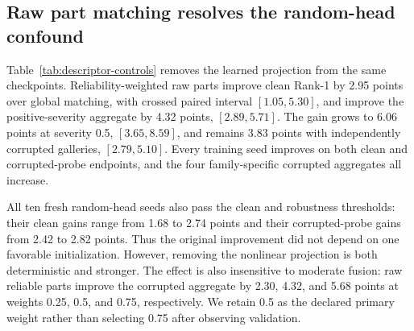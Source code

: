 \documentclass[pdflatex,iicol,sn-apa]{sn-jnl}
\begin{document}
\subsection{Raw part matching resolves the random-head confound}

\begin{table}[t]
\centering
\caption{Checkpoint-only descriptor controls on CASIA-B validation Rank-1
(\%). All conditions use the same three selected metric-baseline backbones and
the fixed 0.5 fusion weight. ``Fresh random heads'' is the mean across ten
projection seeds; brackets give the range after averaging the three backbone
seeds. No control retrains the backbone or local head.}
\label{tab:descriptor-controls}
\small
\setlength{\tabcolsep}{3.5pt}
\end{table}

Table~\ref{tab:descriptor-controls} removes the learned projection from the
same checkpoints. Reliability-weighted raw parts improve clean Rank-1 by 2.95
points over global matching, with crossed paired interval
$[1.05,5.30]$, and improve the positive-severity aggregate by 4.32 points,
$[2.89,5.71]$. The gain grows to 6.06 points at severity 0.5,
$[3.65,8.59]$, and remains 3.83 points with independently corrupted galleries,
$[2.79,5.10]$. Every training seed improves on both clean and corrupted-probe
endpoints, and the four family-specific corrupted aggregates all increase.

All ten fresh random-head seeds also pass the clean and robustness thresholds:
their clean gains range from 1.68 to 2.74 points and their corrupted-probe gains
from 2.42 to 2.82 points. Thus the original improvement did not depend on one
favorable initialization. However, removing the nonlinear projection is both
deterministic and stronger. The effect is also insensitive to moderate fusion:
raw reliable parts improve the corrupted aggregate by 2.30, 4.32, and 5.68
points at weights 0.25, 0.5, and 0.75, respectively. We retain 0.5 as the
declared primary weight rather than selecting 0.75 after observing validation.
\end{document}

